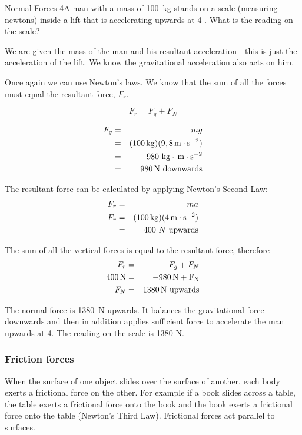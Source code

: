 \begin{wex}{Normal Forces 4}{A man with a mass of 100~kg stands on a scale (measuring newtons) inside a lift that is accelerating upwards at 4 \mss. What is the reading on the scale?}{
We are given the mass of the man and his resultant acceleration - this is just the acceleration of the lift. We know the gravitational acceleration also acts on him.

Once again we can use Newton's laws. We know that the sum of all the forces must equal the resultant force, $F_r$.

\begin{equation*}
F_r=F_g+F_N
\end{equation*}

\begin{eqnarray*}
F_g&=&mg \\
&=& (100\,\mathrm{kg})(9,8\,\mathrm{m \cdot s^{-2}})\\
&=& 980\ \mathrm{kg}\cdot\,\mathrm{m \cdot s^{-2}} \\
&=& 980\,\rm{N}\ \mathrm{downwards}
\end{eqnarray*}

The resultant force can be calculated by applying Newton's Second Law:
\begin{eqnarray*}
F_r &=& ma\\
F_r &=& (100\,\mathrm{kg})(4\,\mathrm{m \cdot s^{-2}})\\
&=& 400~N~\mbox{upwards}
\end{eqnarray*}

The sum of all the vertical forces is equal to the resultant force, therefore
\begin{eqnarray*}
F_r&=&F_g + F_N \\
400\,\rm{N} &=& -980\,\rm{N} + F_N\\
F_N &=& 1380\,\rm{N}\ \mathrm{upwards}
\end{eqnarray*}

The normal force is 1380~N upwards. It balances the gravitational force downwards and then in addition applies sufficient force to accelerate the man upwards at 4\mss.  The reading on the scale is 1380 N.}
\end{wex}



\subsubsection{Friction forces}
When the surface of one object slides over the surface of another, each body exerts a frictional force on the other. For example if a book slides across a table, the table exerts a frictional force onto the book and the book exerts a frictional force onto the table (Newton's Third Law). Frictional forces act parallel to surfaces.\\

